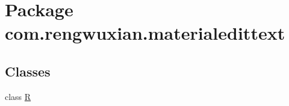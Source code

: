 \hypertarget{namespacecom_1_1rengwuxian_1_1materialedittext}{}\section{Package com.\+rengwuxian.\+materialedittext}
\label{namespacecom_1_1rengwuxian_1_1materialedittext}
\subsection*{Classes}
\begin{DoxyCompactItemize}
\item 
class \hyperlink{classcom_1_1rengwuxian_1_1materialedittext_1_1_r}{R}
\end{DoxyCompactItemize}
